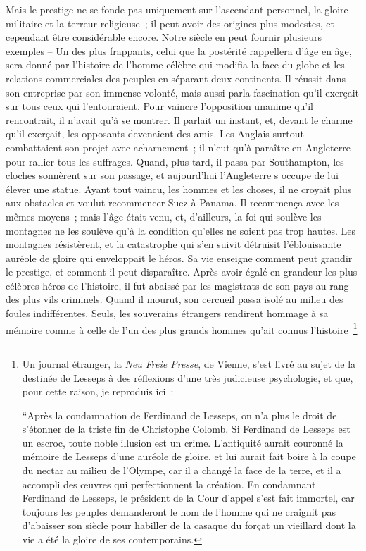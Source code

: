 \documentclass[french,twoside]{book} %
\begin{document}
Mais le prestige ne se fonde pas uniquement sur l’ascendant personnel, la gloire militaire et la terreur religieuse ; il peut avoir des origines plus modestes, et cepen­dant être considérable encore. Notre siècle en peut fournir plusieurs exemples – Un des plus frappants, celui que la postérité rappellera d’âge en âge, sera donné par l’histoire de l’homme célèbre qui modifia la face du globe et les relations commer­ciales des peuples en séparant deux continents. Il réussit dans son entreprise par son immense volonté, mais aussi parla fascination qu’il exerçait sur tous ceux qui l’entouraient. Pour vaincre l’opposition unanime qu’il rencontrait, il n’avait qu’à se montrer. Il parlait un instant, et, devant le charme qu’il exerçait, les opposants devenaient des amis. Les Anglais surtout combattaient son projet avec acharnement ; il n’eut qu’à paraître en Angleterre pour rallier tous les suffrages. Quand, plus tard, il passa par Southampton, les cloches sonnèrent sur son passage, et aujourd’hui l’Angleterre s occupe de lui élever une statue. Ayant tout vaincu, les hommes et les choses, il ne croyait plus aux obstacles et voulut recommencer Suez à Panama. Il recommença avec les mêmes moyens ; mais l’âge était venu, et, d’ailleurs, la foi qui soulève les montagnes ne les soulève qu’à la condition qu’elles ne soient pas trop hautes. Les montagnes résistèrent, et la catastrophe qui s’en suivit détruisit l’éblouis­sante auréole de gloire qui enveloppait le héros. Sa vie enseigne comment peut grandir le prestige, et comment il peut disparaître. Après avoir égalé en grandeur les plus célèbres héros de l’histoire, il fut abaissé par les magistrats de son pays au rang des plus vils criminels. Quand il mourut, son cercueil passa isolé au milieu des foules indifférentes. Seuls, les souverains étrangers rendirent hommage à sa mémoire comme à celle de l’un des plus grands hommes qu’ait connus l’histoire \footnote{ \noindent Un journal étranger, la \emph{Neu Freie Presse}, de Vienne, s’est livré au sujet de la destinée de Lesseps à des réflexions d’une très judicieuse psychologie, et que, pour cette raison, je reproduis ici :\par
 “Après la condamnation de Ferdinand de Lesseps, on n’a plus le droit de s’étonner de la triste fin de Christophe Colomb. Si Ferdinand de Lesseps est un escroc, toute noble illusion est un crime. L’antiquité aurait couronné la mémoire de Lesseps d’une auréole de gloire, et lui aurait fait boire à la coupe du nectar au milieu de l’Olympe, car il a changé la face de la terre, et il a accompli des œuvres qui perfection­nent la création. En condamnant Ferdinand de Lesseps, le président de la Cour d’appel s’est fait immortel, car toujours les peuples demanderont le nom de l’homme qui ne craignit pas d’abaisser son siècle pour habiller de la casaque du forçat un vieillard dont la vie a été la gloire de ses contem­porains.\par
}
\end{document}
